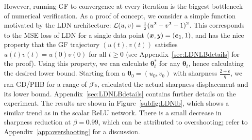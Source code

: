 However, running GF to convergence at every iteration is the biggest bottleneck of numerical verification.
As a proof of concept, we consider a simple function motivated by the LDN architecture: ${\mathcal{L}}(u,v) = \frac{1}{2} (u^2 - v^2 - 1)^2$.
This corresponds to the MSE loss of LDN for a single data point $({\bm{x}},y) = ({\bm{e}}_1, 1)$, and has the nice property that the GF trajectory $(u(t),v(t))$ satisfies $u(t)v(t) = u(0)v(0)$ for all $t \geq 0$ (see Appendix~\ref{sec:LDNLBdetails} for the proof). Using this property, we can calculate $\bm\theta_t^*$ for any $\bm\theta_t$, hence calculating the desired lower bound. Starting from a $\bm\theta_0 = (u_0, v_0)$ with sharpness $\frac{2+\epsilon}{\eta}$, we ran GD/PHB for a range of $\beta$'s, calculated the actual sharpness displacement and its lower bound. Appendix~\ref{sec:LDNLBdetails} contains further details on the experiment.
The results are shown in Figure~\ref{subfig:LDNlb}, which shows a similar trend as in the scalar ReLU network.
There is a small decrease in sharpness reduction at $\beta=0.99$, which can be attributed to overshooting; refer to Appendix~\ref{app:overshooting} for a discussion.